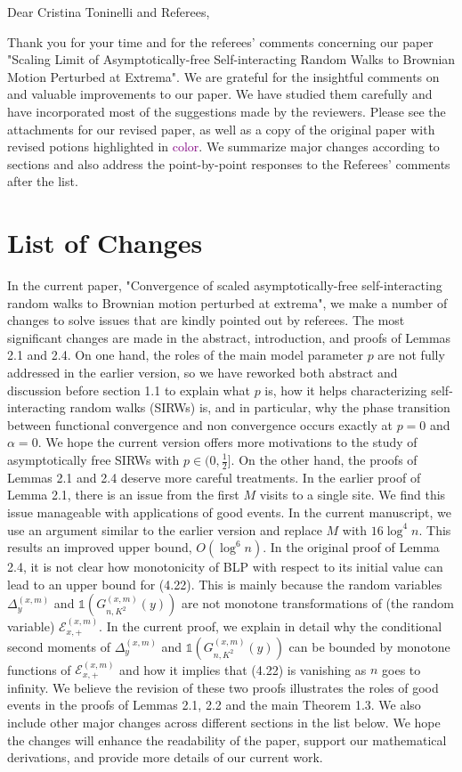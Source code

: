 \documentclass[11pt,a4paper]{article}
\numberwithin{equation}{section}
\newcommand{\edt}[1]{\textcolor{purple}{#1}} %
\begin{document}
	\noindent Dear Cristina Toninelli and Referees,
	
	Thank you for your time and for the referees' comments concerning our paper "Scaling Limit of Asymptotically-free Self-interacting
	Random Walks to Brownian Motion Perturbed at
	Extrema". We are grateful for the insightful comments on and valuable improvements to our paper. We have studied them carefully and have incorporated most of the suggestions made by the reviewers. Please see the attachments for our revised paper, as well as a copy of the original paper with revised potions highlighted in \edt{color}.
	We summarize major changes according to sections and also address the point-by-point responses to the Referees' comments after the list.
	
	\section*{List of Changes}
	In the current paper, "Convergence of scaled asymptotically-free
	self-interacting random walks to Brownian motion
	perturbed at extrema", we make a number of changes to solve issues that are kindly pointed out by referees.
	The most significant changes are made in the abstract, introduction, and proofs of Lemmas 2.1 and 2.4. On one hand, the roles of the main model parameter $p$ are not fully addressed in the earlier version, so we have reworked both abstract and discussion before section 1.1
	to explain what $p$ is, how it helps characterizing self-interacting random walks (SIRWs) is, and in particular, why the phase transition between functional convergence and non convergence occurs exactly at $p=0$ and $\alpha =0$. We hope the current version offers more motivations to the study of asymptotically free SIRWs with $p\in (0,\frac{1}{2}]$. On the other hand, the proofs of Lemmas 2.1 and 2.4 deserve more careful treatments. In the earlier proof of Lemma 2.1, there is an issue from the first $M$ visits to a single site. We find this issue manageable with applications of good events. In the current manuscript, we use an argument similar to the earlier version and replace $M$ with $16\log^4 n$. This results an improved upper bound, $O(\log^6 n)$. In the original proof of Lemma 2.4, it is not clear how monotonicity of BLP with respect to its initial value can lead to an upper bound for (4.22). This is mainly because the random variables $\Delta_{y}^{(x,m)}$ and $\mathbb{1}\left(G^{(x,m)}_{n,K^2}(y) \right)$ are not monotone transformations of (the random variable) $\mathcal{E}^{(x,m)}_{x,+}$. In the current proof, we explain in detail why the conditional second moments of $\Delta_{y}^{(x,m)}$ and $\mathbb{1}\left(G^{(x,m)}_{n,K^2}(y) \right)$ can be bounded by monotone functions of $\mathcal{E}^{(x,m)}_{x,+}$ and how it implies that (4.22) is vanishing as $n$ goes to infinity.  We believe the revision of these two proofs illustrates the roles of good events in the proofs of Lemmas 2.1, 2.2 and the main Theorem 1.3.   
	We also include other major changes across different sections in the list below. We hope the changes will enhance the readability of the paper, support our mathematical derivations, and provide more details of our current work.
	
\end{document}
